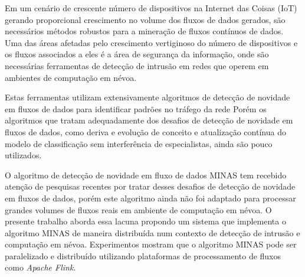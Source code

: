 \begin{resumo}

    Em um cenário de crescente número de dispositivos na Internet das Coisas
    (IoT) gerando proporcional crescimento no volume dos fluxos de dados
    gerados, são necessários métodos robustos para a mineração de fluxos
    contínuos de dados.
    Uma das áreas afetadas pelo crescimento vertiginoso do número de
    dispositivos e os fluxos associados a eles é a área de segurança da
    informação, onde são necessárias ferramentas de detecção de intrusão em
    redes que operem em ambientes de computação em névoa.

    
    
    Estas ferramentas utilizam extensivamente algoritmos de detecção de novidade
    em fluxos de dados para identificar padrões no tráfego da rede
    Porém
    os algoritmos que tratam adequadamente dos desafios de detecção de novidade
    em fluxos de dados, como deriva
    e evolução de conceito e atualização contínua do modelo de classificação sem
    interferência de especialistas, ainda são pouco utilizados.


    O algoritmo de detecção de novidade em fluxo de dados MINAS tem recebido
    atenção de pesquisas recentes por tratar desses desafios de detecção de novidade
    em fluxos de dados, porém este
    algoritmo ainda não foi adaptado para processar grandes volumes de fluxos
    reais em ambiente de computação em névoa.
    O presente trabalho aborda essa lacuna propondo um sistema
    que implementa o algoritmo MINAS de maneira distribuída num contexto
    de detecção de intrusão e computação em névoa.
    Experimentos mostram que o algoritmo MINAS pode ser paralelizado e
    distribuído utilizando plataformas de processamento de fluxos como
    \emph{Apache Flink}.


\end{resumo}

